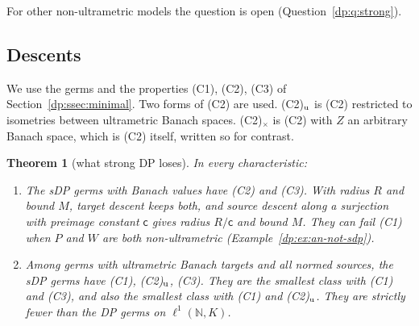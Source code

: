 \documentclass[11pt]{amsart}
\newtheorem{theorem}{Theorem}[section]
\theoremstyle{definition}
\theoremstyle{remark}
\numberwithin{equation}{section}
\newcommand{\N}{\mathbb N}
\theoremstyle{plain}
\theoremstyle{definition}
\theoremstyle{plain}
\begin{document}
For other non-ultrametric models the question is open (Question~\ref{dp:q:strong}).

\subsection{Descents}\label{dp:s:ssec-descents}

We use the germs and the properties (C1), (C2), (C3) of Section~\ref{dp:ssec:minimal}. Two forms of (C2) are used. (C2)$_{\rm u}$ is (C2) restricted to isometries between ultrametric Banach spaces. (C2)$_\times$ is (C2) with $Z$ an arbitrary Banach space, which is (C2) itself, written so for contrast.

\begin{theorem}[what strong DP loses]\label{dp:thm:strong-descent}
In every characteristic:
\begin{enumerate}
\item The sDP germs with Banach values have \textup{(C2)} and \textup{(C3)}. With radius $R$ and bound $M$, target descent keeps both, and source descent along a surjection with preimage constant $\mathsf c$ gives radius $R/\mathsf c$ and bound $M$. They can fail \textup{(C1)} when $P$ and $W$ are both non-ultrametric (Example~\ref{dp:ex:an-not-sdp}).
\item Among germs with ultrametric Banach targets and all normed sources, the sDP germs have \textup{(C1)}, \textup{(C2)}$_{\rm u}$, \textup{(C3)}. They are the smallest class with \textup{(C1)} and \textup{(C3)}, and also the smallest class with \textup{(C1)} and \textup{(C2)}$_{\rm u}$. They are strictly fewer than the DP germs on $\ell^1(\N,K)$.
\end{enumerate}
\end{theorem}
\end{document}
